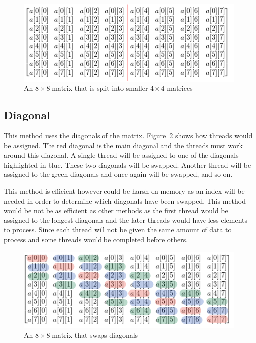 \documentclass[10pt, conference]{IEEEtran}
\begin{document}
\begin{figure}[h!]
\renewcommand{\thefigure}{\arabic{figure}}
\centering
\includegraphics[scale=0.35]{Splitting.png}
\caption{An $8\times8$ matrix that is split into smaller $4\times4$ matrices}
\label{Splitting}
\end{figure}

\subsection{Diagonal}
\label{Diagonal}
This method uses the diagonals of the matrix. Figure~\ref{DiagonalPic} shows how threads would be assigned. The red diagonal is the main diagonal and the threads must work around this diagonal. A single thread will be assigned to one of the diagonals highlighted in blue. These two diagonals will be swapped. Another thread will be assigned to the green diagonals and once again will be swapped, and so on.

This method is efficient however could be harsh on memory as an index will be needed in order to determine which diagonals have been swapped. This method would be not be as efficient as other methods as the first thread would be assigned to the longest diagonals and the later threads would have less elements to process. Since each thread will not be given the same amount of data to process and some threads would be completed before others.

\begin{figure}[h!]
\renewcommand{\thefigure}{\arabic{figure}}
\centering
\includegraphics[scale=0.6]{Diagonal.png}
\caption{An $8\times8$ matrix that swaps diagonals}
\label{DiagonalPic}
\end{figure}
\end{document}
